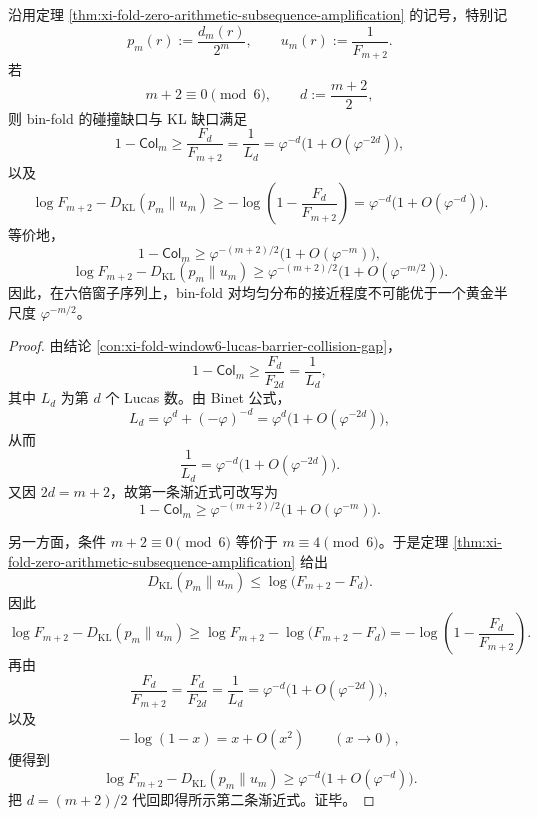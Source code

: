 \begin{theorem}\label{thm:xi-time-part60aca-sixfold-halfscale-defect}
沿用定理 \ref{thm:xi-fold-zero-arithmetic-subsequence-amplification} 的记号，特别记
\[
p_m(r):=\frac{d_m(r)}{2^m},
\qquad
u_m(r):=\frac{1}{F_{m+2}}.
\]
若
\[
m+2\equiv 0\pmod 6,
\qquad
d:=\frac{m+2}{2},
\]
则 bin-fold 的碰撞缺口与 KL 缺口满足
\[
1-\mathsf{Col}_m
\ge
\frac{F_d}{F_{m+2}}
=
\frac{1}{L_d}
=
\varphi^{-d}\bigl(1+O(\varphi^{-2d})\bigr),
\]
以及
\[
\log F_{m+2}-D_{\mathrm{KL}}(p_m\|u_m)
\ge
-\log\!\left(1-\frac{F_d}{F_{m+2}}\right)
=
\varphi^{-d}\bigl(1+O(\varphi^{-d})\bigr).
\]
等价地，
\[
1-\mathsf{Col}_m
\ge
\varphi^{-(m+2)/2}\bigl(1+O(\varphi^{-m})\bigr),
\]
\[
\log F_{m+2}-D_{\mathrm{KL}}(p_m\|u_m)
\ge
\varphi^{-(m+2)/2}\bigl(1+O(\varphi^{-m/2})\bigr).
\]
因此，在六倍窗子序列上，bin-fold 对均匀分布的接近程度不可能优于一个黄金半尺度 \(\varphi^{-m/2}\)。
\end{theorem}
\begin{proof}
由结论 \ref{con:xi-fold-window6-lucas-barrier-collision-gap}，
\[
1-\mathsf{Col}_m
\ge
\frac{F_d}{F_{2d}}
=
\frac{1}{L_d},
\]
其中 \(L_d\) 为第 \(d\) 个 Lucas 数。由 Binet 公式，
\[
L_d=\varphi^d+(-\varphi)^{-d}
=
\varphi^d\bigl(1+O(\varphi^{-2d})\bigr),
\]
从而
\[
\frac{1}{L_d}
=
\varphi^{-d}\bigl(1+O(\varphi^{-2d})\bigr).
\]
又因 \(2d=m+2\)，故第一条渐近式可改写为
\[
1-\mathsf{Col}_m
\ge
\varphi^{-(m+2)/2}\bigl(1+O(\varphi^{-m})\bigr).
\]

另一方面，条件 \(m+2\equiv 0\pmod 6\) 等价于 \(m\equiv 4\pmod 6\)。于是定理 \ref{thm:xi-fold-zero-arithmetic-subsequence-amplification} 给出
\[
D_{\mathrm{KL}}(p_m\|u_m)
\le
\log\!\bigl(F_{m+2}-F_d\bigr).
\]
因此
\[
\log F_{m+2}-D_{\mathrm{KL}}(p_m\|u_m)
\ge
\log F_{m+2}-\log\!\bigl(F_{m+2}-F_d\bigr)
=
-\log\!\left(1-\frac{F_d}{F_{m+2}}\right).
\]
再由
\[
\frac{F_d}{F_{m+2}}
=
\frac{F_d}{F_{2d}}
=
\frac{1}{L_d}
=
\varphi^{-d}\bigl(1+O(\varphi^{-2d})\bigr),
\]
以及
\[
-\log(1-x)=x+O(x^2)
\qquad(x\to 0),
\]
便得到
\[
\log F_{m+2}-D_{\mathrm{KL}}(p_m\|u_m)
\ge
\varphi^{-d}\bigl(1+O(\varphi^{-d})\bigr).
\]
把 \(d=(m+2)/2\) 代回即得所示第二条渐近式。证毕。
\end{proof}

